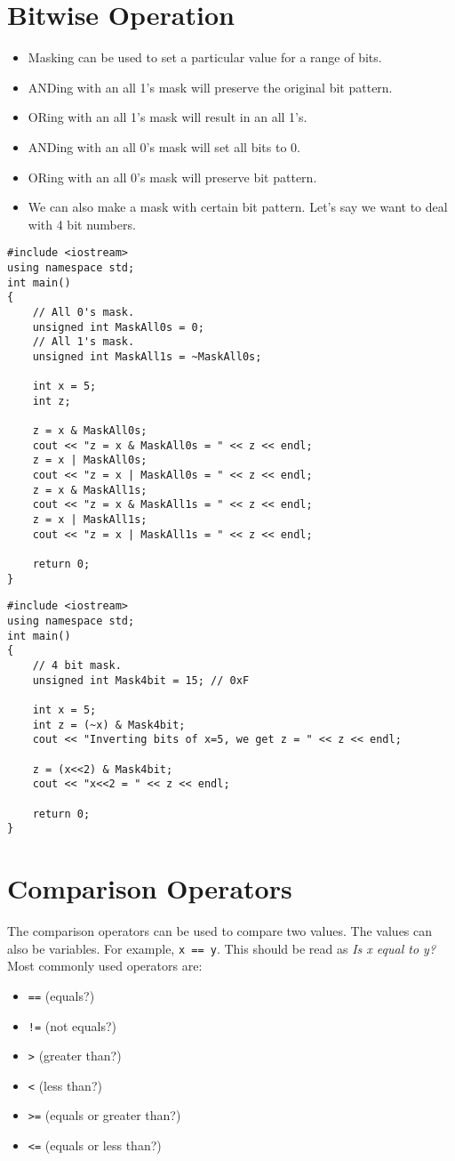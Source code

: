 \documentclass[12pt,a4paper]{article}
\begin{document}
\section{Bitwise Operation}
\begin{itemize}
\item Masking can be used to set a particular value for a range of bits.
\item ANDing with an all 1's mask will preserve the original bit pattern.
\item ORing with an all 1's mask will result in an all 1's.
\item ANDing with an all 0's mask will set all bits to 0.
\item ORing with an all 0's mask will preserve bit pattern.
\item We can also make a mask with certain bit pattern. Let's say we want to deal with 4 bit numbers.
\end{itemize}
\label{Masking}
\begin{lstlisting}[caption={Example: Masking}]
#include <iostream> 
using namespace std; 
int main()
{
	// All 0's mask.
	unsigned int MaskAll0s = 0;
	// All 1's mask.
	unsigned int MaskAll1s = ~MaskAll0s;
	
	int x = 5;
	int z;
	
	z = x & MaskAll0s;
	cout << "z = x & MaskAll0s = " << z << endl;
	z = x | MaskAll0s;
	cout << "z = x | MaskAll0s = " << z << endl;
	z = x & MaskAll1s;
	cout << "z = x & MaskAll1s = " << z << endl;
	z = x | MaskAll1s;
	cout << "z = x | MaskAll1s = " << z << endl;

	return 0;
}
\end{lstlisting}
\begin{lstlisting}[caption={Example: Masking 4 bits}]
#include <iostream> 
using namespace std; 
int main()
{
	// 4 bit mask.
	unsigned int Mask4bit = 15; // 0xF
	
	int x = 5;
	int z = (~x) & Mask4bit;
	cout << "Inverting bits of x=5, we get z = " << z << endl;
	
	z = (x<<2) & Mask4bit;
	cout << "x<<2 = " << z << endl;
	
	return 0;
}
\end{lstlisting}
\section{Comparison Operators}
The comparison operators can be used to compare two values. The values can also be variables.  For example, \verb|x == y|. This should be read as \textit{Is x equal to y?} Most commonly used operators are:
\begin{itemize}
\item \verb|==| (equals?)
\item \verb|!=| (not equals?)
\item \verb|>| (greater than?)
\item \verb|<| (less than?)
\item \verb|>=| (equals or greater than?)
\item \verb|<=| (equals or less than?)
\end{itemize}
\end{document}
